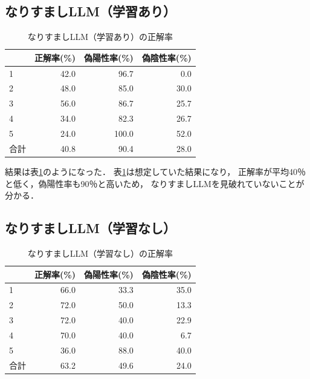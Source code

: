 \documentclass[twocolumn]{jarticle}
\begin{document}
\subsection{なりすましLLM（学習あり）}

\begin{table}%
	\begin{center}
		\caption{なりすましLLM（学習あり）の正解率}
		\label{tbl:spoofing}
	\begin{tabular}{lrrr} \hline
		  & 正解率(\%) & 偽陽性率(\%) & 偽陰性率(\%)  \\ \hline
	  1 &      42.0 &         96.7 &         0.0  \\
		2 &      48.0 &         85.0 &        30.0  \\ 
	  3 &      56.0 &         86.7 &        25.7  \\ 
	  4 &      34.0 &         82.3 &        26.7  \\ 
	  5 &      24.0 &        100.0 &        52.0  \\ \hline
	合計 &     40.8 &         90.4 &        28.0  \\ \hline
\end{tabular}
	\end{center}
\end{table}


結果は表\ref{tbl:spoofing}のようになった．
表\ref{tbl:spoofing}は想定していた結果になり，
正解率が平均40％と低く，偽陽性率も90％と高いため，
なりすましLLMを見破れていないことが分かる．

\subsection{なりすましLLM（学習なし）}

\begin{table}%
	\begin{center}
		\caption{なりすましLLM（学習なし）の正解率}
		\label{tbl:Zero-shot}
	\begin{tabular}{lrrr} \hline
			& 正解率(\%) & 偽陽性率(\%) & 偽陰性率(\%)  \\ \hline
		1 &      66.0 &         33.3 &        35.0  \\
		2 &      72.0 &         50.0 &        13.3  \\ 
		3 &      72.0 &         40.0 &        22.9  \\ 
		4 &      70.0 &         40.0 &         6.7  \\ 
		5 &      36.0 &         88.0 &        40.0  \\ \hline
	合計 &     63.2 &        	 49.6 &        24.0  \\ \hline
\end{tabular}
	\end{center}
\end{table}
\end{document}
